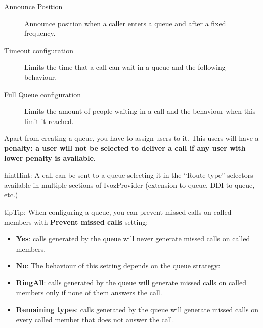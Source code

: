 \documentclass[letterpaper,10pt,english]{sphinxmanual}
\begin{document}
\begin{description}
\item[{Announce Position}] \leavevmode{}\label{administration_portal/client/vpbx/routing_endpoints/queues:term-announce-position}
Announce position when a caller enters a queue and after a fixed frequency.

\item[{Timeout configuration}] \leavevmode{}\label{administration_portal/client/vpbx/routing_endpoints/queues:term-timeout-configuration}
Limits the time that a call can wait in a queue and the following behaviour.

\item[{Full Queue configuration}] \leavevmode{}\label{administration_portal/client/vpbx/routing_endpoints/queues:term-full-queue-configuration}
Limits the amount of people waiting in a call and the behaviour when this limit
it reached.

\end{description}

Apart from creating a queue, you have to assign users to it. This users will have
a \textbf{penalty: a user will not be selected to deliver a call if any user with lower
penalty is available}.

\begin{notice}{hint}{Hint:}
A call can be sent to a queue selecting it in the ``Route type'' selectors
available in multiple sections of IvozProvider (extension to queue, DDI
to queue, etc.)
\end{notice}

\begin{notice}{tip}{Tip:}
When configuring a queue, you can prevent missed calls on called members with \textbf{Prevent missed calls} setting:
\begin{itemize}
\item {} 
\textbf{Yes}: calls generated by the queue will never generate missed calls on called members.

\item {} 
\textbf{No}: The behaviour of this setting depends on the queue strategy:

\item {} 
\textbf{RingAll}: calls generated by the queue will generate missed calls on called members only if none of them answers the call.

\item {} 
\textbf{Remaining types}: calls generated by the queue will generate missed calls on every called member that does not answer the call.

\end{itemize}
\end{notice}
\end{document}
